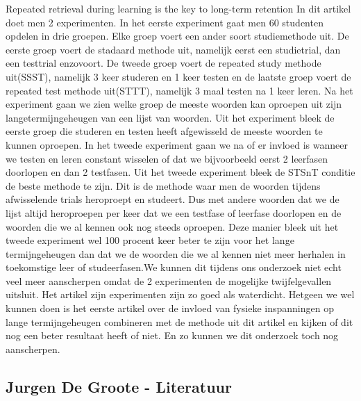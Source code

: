 \documentclass{voorstel}
\begin{document}
	Repeated retrieval during learning is the key to long-term retention \autocite{Karpicke2007}
	In dit artikel doet men 2 experimenten. In het eerste experiment gaat men 60 studenten opdelen in drie groepen. Elke groep voert een ander soort studiemethode uit. De eerste groep voert de stadaard methode uit, namelijk eerst een studietrial, dan een testtrial enzovoort. De tweede groep voert de repeated study methode uit(SSST), namelijk 3 keer studeren en 1 keer testen en de laatste groep voert de repeated test methode uit(STTT), namelijk 3 maal testen na 1 keer leren. Na het experiment gaan we zien welke groep de meeste woorden kan oproepen uit zijn langetermijngeheugen van een lijst van woorden. Uit het experiment bleek de eerste groep die studeren en testen heeft afgewisseld de meeste woorden te kunnen oproepen. In het tweede experiment gaan we na of er invloed is wanneer we testen en leren constant wisselen of dat we bijvoorbeeld eerst 2 leerfasen doorlopen en dan 2 testfasen. Uit het tweede experiment bleek de STSnT conditie de beste methode te zijn. Dit is de methode waar men de woorden tijdens afwisselende trials heroproept en studeert. Dus met andere woorden dat we de lijst altijd heroproepen per keer dat we een testfase of leerfase doorlopen en de woorden die we al kennen ook nog steeds oproepen. Deze manier bleek uit het tweede experiment wel 100 procent keer beter te zijn voor het lange termijngeheugen dan dat we de woorden die we al kennen niet meer herhalen in toekomstige leer of studeerfasen.We kunnen dit tijdens ons onderzoek niet echt veel meer aanscherpen omdat de 2 experimenten de mogelijke twijfelgevallen uitsluit. Het artikel zijn experimenten zijn zo goed als waterdicht. Hetgeen we wel kunnen doen is het eerste artikel over de invloed van fysieke inspanningen op lange termijngeheugen combineren met de methode uit dit artikel en kijken of dit nog een beter resultaat heeft of niet. En zo kunnen we dit onderzoek toch nog aanscherpen.
	
	
	\subsection{Jurgen De Groote - Literatuur}
	
\end{document}
